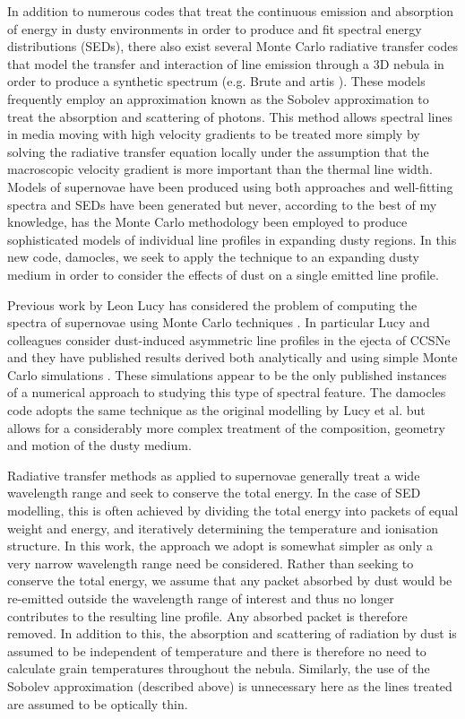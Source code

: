 In addition to numerous codes that treat the continuous emission and absorption of energy in dusty environments in order to produce and fit spectral energy distributions (SEDs), there also exist several Monte Carlo radiative transfer codes that model the transfer and interaction of line emission through a 3D nebula in order to produce a synthetic spectrum (e.g. Brute \citep{Thomas2003} and {\sc artis} \citep{Kromer2009}).  These  models frequently employ an approximation known as the Sobolev approximation \citep{Sobolev1957} to treat the absorption and scattering of photons.  This method allows spectral lines in media moving with high velocity gradients to be treated more simply by solving the radiative transfer equation locally under the assumption that the macroscopic velocity gradient is more important than the thermal line width.  Models of supernovae have been produced using both approaches and well-fitting spectra and SEDs have been generated but never, according to the best of my knowledge, has the Monte Carlo methodology been employed to produce sophisticated models of individual line profiles in expanding dusty regions.  In this new code, {\sc damocles}, we seek to apply the technique to an expanding dusty medium in order to consider the effects of dust on a single emitted line profile.  

Previous work by Leon Lucy has considered the problem of computing the spectra of supernovae using Monte Carlo techniques \citep{Lucy1987,Lucy1999,Lucy2002,Lucy2003,Lucy2005c,Lucy2005b}.  In particular Lucy and colleagues consider dust-induced asymmetric line profiles in the ejecta of CCSNe and they have published results derived both analytically and using simple Monte Carlo simulations \citep{Lucy1989,Lucy1991}.  These simulations appear to be the only published instances of a numerical approach to studying this type of spectral feature.  The {\sc damocles} code adopts the same technique as the original modelling by Lucy et al. but allows for a considerably more complex treatment of the composition, geometry and motion of the dusty medium.

Radiative transfer methods as applied to supernovae generally treat a wide wavelength range and seek to conserve the total energy.  In the case of SED modelling, this is often achieved by dividing the total energy into packets of equal weight and energy, and iteratively determining the temperature and ionisation structure.  In this work, the approach we adopt is somewhat simpler as only a very narrow wavelength range need be considered.  Rather than seeking to conserve the total energy, we assume that any packet absorbed by dust would be re-emitted outside the wavelength range of interest and thus no longer contributes to the resulting line profile.  Any absorbed packet is therefore removed.  In addition to this, the absorption and scattering of radiation by dust is assumed to be independent of temperature and there is therefore no need to calculate grain temperatures throughout the nebula.  Similarly, the use of the Sobolev approximation (described above) is unnecessary here as the lines treated are assumed to be optically thin. 

